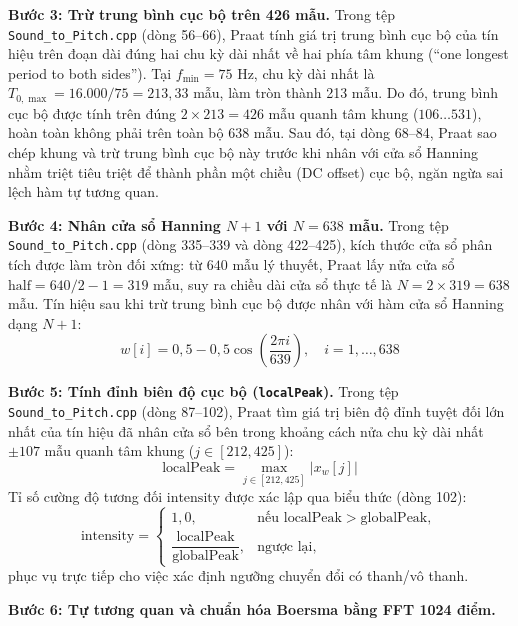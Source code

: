 \textbf{Bước 3: Trừ trung bình cục bộ trên 426 mẫu.}
Trong tệp \texttt{Sound\_to\_Pitch.cpp} (dòng 56--66), Praat tính giá trị trung bình cục bộ của tín hiệu trên đoạn dài đúng hai chu kỳ dài nhất về hai phía tâm khung (``one longest period to both sides''). Tại $f_{\min} = 75\text{ Hz}$, chu kỳ dài nhất là $T_{0,\max} = 16.000 / 75 = 213{,}33$ mẫu, làm tròn thành 213 mẫu. Do đó, trung bình cục bộ được tính trên đúng $2 \times 213 = 426$ mẫu quanh tâm khung ($106 \dots 531$), hoàn toàn không phải trên toàn bộ 638 mẫu. Sau đó, tại dòng 68--84, Praat sao chép khung và trừ trung bình cục bộ này trước khi nhân với cửa sổ Hanning nhằm triệt tiêu triệt để thành phần một chiều (DC offset) cục bộ, ngăn ngừa sai lệch hàm tự tương quan.

\textbf{Bước 4: Nhân cửa sổ Hanning $N+1$ với $N = 638$ mẫu.}
Trong tệp \texttt{Sound\_to\_Pitch.cpp} (dòng 335--339 và dòng 422--425), kích thước cửa sổ phân tích được làm tròn đối xứng: từ $640$ mẫu lý thuyết, Praat lấy nửa cửa sổ $\text{half} = 640/2 - 1 = 319$ mẫu, suy ra chiều dài cửa sổ thực tế là $N = 2 \times 319 = 638$ mẫu. Tín hiệu sau khi trừ trung bình cục bộ được nhân với hàm cửa sổ Hanning dạng $N+1$:
\begin{equation}
w[i] = 0{,}5 - 0{,}5 \cos\left(\frac{2\pi i}{639}\right), \quad i = 1, \dots, 638
\end{equation}

\textbf{Bước 5: Tính đỉnh biên độ cục bộ (\texttt{localPeak}).}
Trong tệp \texttt{Sound\_to\_Pitch.cpp} (dòng 87--102), Praat tìm giá trị biên độ đỉnh tuyệt đối lớn nhất của tín hiệu đã nhân cửa sổ bên trong khoảng cách nửa chu kỳ dài nhất $\pm 107$ mẫu quanh tâm khung ($j \in [212, 425]$):
\begin{equation}
\text{localPeak} = \max_{j \in [212, 425]} |x_w[j]|
\end{equation}
Tỉ số cường độ tương đối $\text{intensity}$ được xác lập qua biểu thức (dòng 102):
\begin{equation}
\text{intensity} = \begin{cases}
1{,}0, & \text{nếu } \text{localPeak} > \text{globalPeak}, \\
\dfrac{\text{localPeak}}{\text{globalPeak}}, & \text{ngược lại},
\end{cases}
\end{equation}
phục vụ trực tiếp cho việc xác định ngưỡng chuyển đổi có thanh/vô thanh.

\textbf{Bước 6: Tự tương quan và chuẩn hóa Boersma bằng FFT 1024 điểm.}

